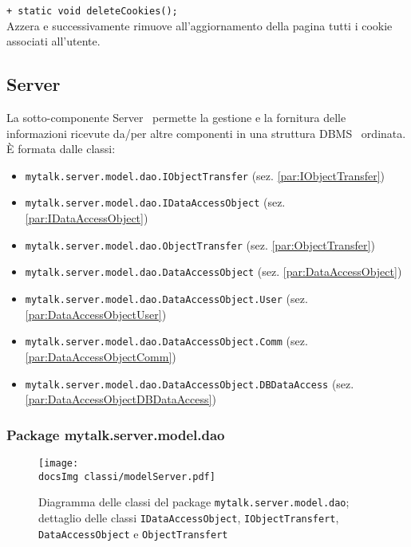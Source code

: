 {\begin{sloppypar}
{{{{\begin{itemize}
{					\texttt{+ static void deleteCookies();}\\
					Azzera e successivamente rimuove all'aggiornamento della pagina tutti i cookie\g~ associati all'utente.\\
				}
			\end{itemize}
			}
		}
      }




\subsection{Server}{\label{model.server}
La sotto-componente Server\g~ permette la gestione e la fornitura delle informazioni ricevute da/per altre componenti in una struttura DBMS\g~ ordinata.
\`E formata dalle classi:
\begin{itemize}
	\item[] \texttt{mytalk.server.model.dao.IObjectTransfer} (sez. \ref{par:IObjectTransfer})
	\item[] \texttt{mytalk.server.model.dao.IDataAccessObject} (sez. \ref{par:IDataAccessObject})
	\item[] \texttt{mytalk.server.model.dao.ObjectTransfer} (sez. \ref{par:ObjectTransfer})
	\item[] \texttt{mytalk.server.model.dao.DataAccessObject} (sez. \ref{par:DataAccessObject})
	\item[] \texttt{mytalk.server.model.dao.DataAccessObject.User} (sez. \ref{par:DataAccessObjectUser})
	\item[] \texttt{mytalk.server.model.dao.DataAccessObject.Comm} (sez. \ref{par:DataAccessObjectComm})
	\item[] \texttt{mytalk.server.model.dao.DataAccessObject.DBDataAccess} (sez. \ref{par:DataAccessObjectDBDataAccess})
\end{itemize}


\subsubsection{Package mytalk.server.model.dao}{

	\begin{figure}[h!tbp]
		\centering
		\label{fig:figModelServer}
		\texttt{[image: \\docsImg classi/modelServer.pdf]}
		\caption{Diagramma delle classi del package \nolinkurl{mytalk.server.model.dao}; dettaglio delle classi \nolinkurl{IDataAccessObject}, \nolinkurl{IObjectTransfert}, \nolinkurl{DataAccessObject} e \nolinkurl{ObjectTransfert}}	
	\end{figure}	
		
}}}
\end{sloppypar}}
